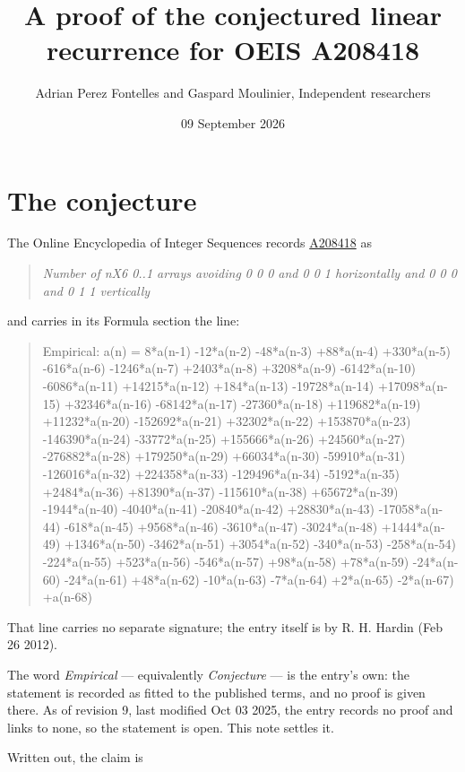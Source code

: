 \documentclass[11pt]{article}
\title{A proof of the conjectured linear recurrence for OEIS A208418}
\author{Adrian Perez Fontelles and Gaspard Moulinier, Independent researchers}
\date{09 September 2026}
\theoremstyle{definition}
\begin{document}
\maketitle
\section{The conjecture}

The Online Encyclopedia of Integer Sequences records \href{https://oeis.org/A208418}{A208418} as

\begin{quote}\itshape Number of nX6 0..1 arrays avoiding 0 0 0 and 0 0 1 horizontally and 0 0 0 and 0 1 1 vertically\end{quote}

and carries in its Formula section the line:

\begin{quote}\ttfamily Empirical: a(n) = 8*a(n-1) -12*a(n-2) -48*a(n-3) +88*a(n-4) +330*a(n-5) -616*a(n-6) -1246*a(n-7) +2403*a(n-8) +3208*a(n-9) -6142*a(n-10) -6086*a(n-11) +14215*a(n-12) +184*a(n-13) -19728*a(n-14) +17098*a(n-15) +32346*a(n-16) -68142*a(n-17) -27360*a(n-18) +119682*a(n-19) +11232*a(n-20) -152692*a(n-21) +32302*a(n-22) +153870*a(n-23) -146390*a(n-24) -33772*a(n-25) +155666*a(n-26) +24560*a(n-27) -276882*a(n-28) +179250*a(n-29) +66034*a(n-30) -59910*a(n-31) -126016*a(n-32) +224358*a(n-33) -129496*a(n-34) -5192*a(n-35) +2484*a(n-36) +81390*a(n-37) -115610*a(n-38) +65672*a(n-39) -1944*a(n-40) -4040*a(n-41) -20840*a(n-42) +28830*a(n-43) -17058*a(n-44) -618*a(n-45) +9568*a(n-46) -3610*a(n-47) -3024*a(n-48) +1444*a(n-49) +1346*a(n-50) -3462*a(n-51) +3054*a(n-52) -340*a(n-53) -258*a(n-54) -224*a(n-55) +523*a(n-56) -546*a(n-57) +98*a(n-58) +78*a(n-59) -24*a(n-60) -24*a(n-61) +48*a(n-62) -10*a(n-63) -7*a(n-64) +2*a(n-65) -2*a(n-67) +a(n-68)\end{quote}

That line carries no separate signature; the entry itself is by R. H. Hardin (Feb 26 2012).

The word {\itshape Empirical} --- equivalently {\itshape Conjecture} --- is the entry's own: the statement is recorded as fitted to the published terms, and no proof is given there. As of revision 9, last modified Oct 03 2025, the entry records no proof and links to none, so the statement is open. This note settles it.

Written out, the claim is
\end{document}
